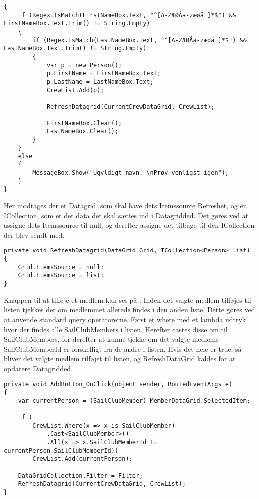 \begin{lstlisting}[frame=single, caption=Add Guest Buttton, label=AddGuestButton]
{
    if (Regex.IsMatch(FirstNameBox.Text, "^[A-ZÆØÅa-zæøå ]*$") && FirstNameBox.Text.Trim() != String.Empty)
    {
        if (Regex.IsMatch(LastNameBox.Text, "^[A-ZÆØÅa-zæøå ]*$") && LastNameBox.Text.Trim() != String.Empty)
        {
            var p = new Person();
            p.FirstName = FirstNameBox.Text;
            p.LastName = LastNameBox.Text;
            CrewList.Add(p);

            RefreshDatagrid(CurrentCrewDataGrid, CrewList);

            FirstNameBox.Clear();
            LastNameBox.Clear();
        }
    }
    else
    {
        MessageBox.Show("Ugyldigt navn. \nPrøv venligst igen");
    }
}      
\end{lstlisting}

Her modtages der et Datagrid, som skal have dets Itemssource Refreshet, og en ICollection, som er det data der skal sættes ind i Datagridded. 
Det gøres ved at assigne dets Itemssource til null, og derefter assigne det tilbage til den ICollection der blev sendt med. 

\begin{lstlisting}[frame=single, caption=Refresh Datagrid, label=RefreshDatagrid]
private void RefreshDatagrid(DataGrid Grid, ICollection<Person> list)
{
    Grid.ItemsSource = null;
    Grid.ItemsSource = list;
}
\end{lstlisting}

Knappen til at tilføje et medlem kan ses på .
Inden det valgte medlem tilføjes til listen tjekkes der om medlemmet allerede findes i den anden liste. 
Dette gøres ved at anvende standard query operatorerne. 
Først et where med et lambda udtryk hvor der findes alle SailClubMembers i listen. 
Herefter castes disse om til SailClubMembers, for derefter at kunne tjekke om det valgte medlems SailClubMemberId er forskelligt fra de andre i listen. 
Hvis det hele er true, så bliver det valgte medlem tilføjet til listen, og RefreshDataGrid kaldes for at opdatere Datagridded.

\begin{lstlisting}[frame=single, caption=Add Member, label=AddMember]
private void AddButton_OnClick(object sender, RoutedEventArgs e)
{
    var currentPerson = (SailClubMember) MemberDataGrid.SelectedItem;

    if (
        CrewList.Where(x => x is SailClubMember)
            .Cast<SailClubMember>()
            .All(x => x.SailClubMemberId != currentPerson.SailClubMemberId))
        CrewList.Add(currentPerson);

    DataGridCollection.Filter = Filter; 
    RefreshDatagrid(CurrentCrewDataGrid, CrewList);
}
\end{lstlisting}

